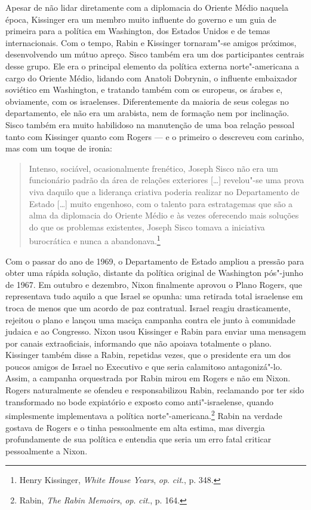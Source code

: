 Apesar de não lidar diretamente com a diplomacia do Oriente
Médio naquela época, Kissinger era um membro muito influente do governo e um guia de
primeira para a política em Washington, dos Estados Unidos e de temas internacionais.
Com o tempo, Rabin e Kissinger tornaram"-se amigos próximos,
desenvolvendo um mútuo apreço. Sisco também era um dos
participantes centrais desse grupo. Ele era o principal elemento da política
externa norte"-americana a cargo do Oriente Médio, lidando com Anatoli
Dobrynin, o influente embaixador soviético em Washington, e tratando também com os
europeus, os árabes e, obviamente, com os israelenses. Diferentemente da
maioria de seus colegas no departamento, ele não era um arabista, nem de
formação nem por inclinação. Sisco também era muito habilidoso na
manutenção de uma boa relação pessoal tanto com Kissinger quanto com
Rogers --- e o primeiro o descreveu com carinho, mas com um toque de ironia:

\begin{quote}
Intenso, sociável, ocasionalmente frenético, Joseph Sisco não era um
funcionário padrão da área de relações exteriores {[}\ldots{}{]} revelou"-se uma
prova viva daquilo que a liderança criativa poderia realizar no
Departamento de Estado {[}\ldots{}{]} muito engenhoso, com o talento para
estratagemas que são a alma da diplomacia do Oriente Médio e às vezes
oferecendo mais soluções do que os problemas existentes, Joseph Sisco
tomava a iniciativa burocrática e nunca a abandonava.\footnote{Henry Kissinger, 
\emph{White House Years}, \emph{op}. \emph{cit}., p. 348.}
\end{quote}

Com o passar do ano de 1969, o Departamento de Estado ampliou a pressão
para obter uma rápida solução, distante da política original de
Washington pós"-junho de 1967. Em outubro e dezembro, Nixon finalmente
aprovou o Plano Rogers, que representava tudo aquilo a que Israel se
opunha: uma retirada total israelense em troca de menos que um acordo de
paz contratual. Israel reagiu drasticamente, rejeitou o plano e lançou
uma maciça campanha contra ele junto à comunidade judaica e ao
Congresso. Nixon usou Kissinger e Rabin para enviar uma mensagem por
canais extraoficiais, informando que não apoiava totalmente o plano.
Kissinger também disse a Rabin, repetidas vezes, que o presidente era um
dos poucos amigos de Israel no Executivo e que seria calamitoso
antagonizá"-lo. Assim, a campanha orquestrada por Rabin mirou em Rogers e
não em Nixon. Rogers naturalmente se ofendeu e responsabilizou Rabin,
reclamando por ter sido transformado no bode expiatório e exposto como
anti"-israelense, quando simplesmente implementava a política
norte"-americana.\footnote{Rabin, \emph{The Rabin Memoirs}, 
\emph{op}. \emph{cit}., p. 164.} Rabin na verdade gostava de Rogers e o tinha
pessoalmente em alta estima, mas divergia profundamente de sua política
e entendia que seria um erro fatal criticar pessoalmente a Nixon.

